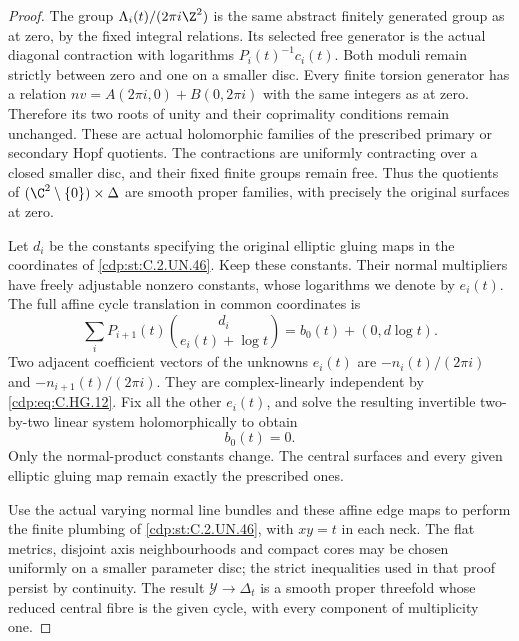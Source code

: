 \begin{proof}
The group $\Lambda_i(t)/(2\pi i\Z^2)$ is
the same abstract finitely generated group
as at zero, by the fixed integral relations.
Its selected free generator is the actual
diagonal contraction with logarithms
$P_i(t)^{-1}c_i(t)$. Both moduli remain
strictly between zero and one on a smaller
disc. Every finite torsion generator has
a relation $n v=A(2\pi i,0)+B(0,2\pi i)$
with the same integers as at zero. Therefore
its two roots of unity and their coprimality
conditions remain unchanged. These are
actual holomorphic families of the prescribed
primary or secondary Hopf quotients. The
contractions are uniformly contracting over
a closed smaller disc, and their fixed
finite groups remain free. Thus the
quotients of $(\C^2\setminus\{0\})\times\Delta$
are smooth proper families, with precisely
the original surfaces at zero.

Let $d_i$ be the constants specifying the
original elliptic gluing maps in the
coordinates of \ref{cdp:st:C.2.UN.46}. Keep these constants.
Their normal multipliers have freely
adjustable nonzero constants, whose logarithms
we denote by $e_i(t)$. The full affine cycle
translation in common coordinates is
\[
 \sum_iP_{i+1}(t)
        \binom{d_i}{e_i(t)+\log t}
       =b_0(t)+(0,d\log t).
\tag{C.HG.13}\label{cdp:eq:C.HG.13}
\]
Two adjacent coefficient vectors of the
unknowns $e_i(t)$ are
$-n_i(t)/(2\pi i)$ and $-n_{i+1}(t)/(2\pi i)$.
They are complex-linearly independent by
\eqref{cdp:eq:C.HG.12}. Fix all the other $e_i(t)$, and
solve the resulting invertible two-by-two
linear system holomorphically to obtain
\[
                              b_0(t)=0.
\tag{C.HG.14}\label{cdp:eq:C.HG.14}
\]
Only the normal-product constants change.
The central surfaces and every given
elliptic gluing map remain exactly the
prescribed ones.

Use the actual varying normal line bundles
and these affine edge maps to perform the
finite plumbing of \ref{cdp:st:C.2.UN.46}, with $xy=t$
in each neck. The flat metrics, disjoint
axis neighbourhoods and compact cores may
be chosen uniformly on a smaller parameter
disc; the strict inequalities used in that
proof persist by continuity. The result
$\mathcal Y\to\Delta_t$ is a smooth proper
threefold whose reduced central fibre is
the given cycle, with every component
of multiplicity one.


\end{proof}
